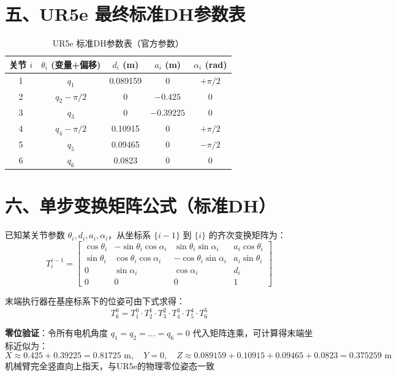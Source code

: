 \documentclass[a4paper,12pt]{article}
\begin{document}
\section*{五、UR5e 最终标准DH参数表}
\begin{table}[h]
\centering
\caption{UR5e 标准DH参数表（官方参数）}
\begin{tabular}{c|c|c|c|c}
\toprule
\textbf{关节 $i$} & \textbf{$\theta_i$ (变量+偏移)} & \textbf{$d_i$ (m)} & \textbf{$a_i$ (m)} & \textbf{$\alpha_i$ (rad)} \\
\midrule
1  & $q_1$               & 0.089159  & 0         & $+\pi/2$ \\
2  & $q_2 - \pi/2$       & 0         & $-0.425$  & 0       \\
3  & $q_3$               & 0         & $-0.39225$& 0       \\
4  & $q_4 - \pi/2$       & 0.10915   & 0         & $+\pi/2$ \\
5  & $q_5$               & 0.09465   & 0         & $-\pi/2$ \\
6  & $q_6$               & 0.0823    & 0         & 0       \\
\bottomrule
\end{tabular}
\end{table}
\vspace{0.5cm}

\section*{六、单步变换矩阵公式（标准DH）}
已知某关节参数 $\theta_i, d_i, a_i, \alpha_i$，从坐标系 $\{i-1\}$ 到 $\{i\}$ 的齐次变换矩阵为：
\begin{equation}
T_i^{i-1} = 
\begin{bmatrix}
\cos\theta_i & -\sin\theta_i \cos\alpha_i & \sin\theta_i \sin\alpha_i & a_i \cos\theta_i \\
\sin\theta_i & \cos\theta_i \cos\alpha_i & -\cos\theta_i \sin\alpha_i & a_i \sin\theta_i \\
0 & \sin\alpha_i & \cos\alpha_i & d_i \\
0 & 0 & 0 & 1
\end{bmatrix}
\end{equation}

末端执行器在基座标系下的位姿可由下式求得：
\begin{equation}
T_6^0 = T_1^0 \cdot T_2^1 \cdot T_3^2 \cdot T_4^3 \cdot T_5^4 \cdot T_6^5
\end{equation}

\textbf{零位验证}：令所有电机角度 $q_1 = q_2 = \dots = q_6 = 0$ 代入矩阵连乘，可计算得末端坐标近似为：
\begin{equation}
X \approx 0.425 + 0.39225 = 0.81725 \text{ m},\quad
Y = 0,\quad
Z \approx 0.089159 + 0.10915 + 0.09465 + 0.0823 = 0.375259 \text{ m}
\end{equation}
机械臂完全竖直向上指天，与UR5e的物理零位姿态一致
\end{document}
